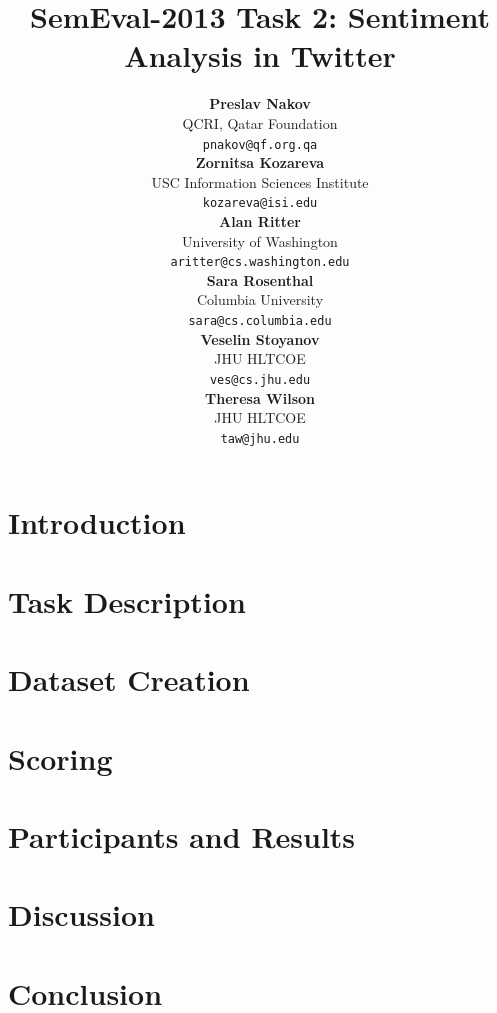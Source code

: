 \documentclass[11pt,letterpaper]{article}
\title{SemEval-2013 Task 2: Sentiment Analysis in Twitter}
\author{
{\bf Preslav Nakov}\\QCRI, Qatar Foundation\\{\small {\tt pnakov@qf.org.qa}}\\
{\bf Zornitsa Kozareva}\\USC Information Sciences Institute\\{\small {\tt kozareva@isi.edu}}\\
{\bf Alan Ritter}\\University of Washington\\{\small {\tt aritter@cs.washington.edu}}\\
\And
{\bf Sara Rosenthal }\\Columbia University\\{\small {\tt sara@cs.columbia.edu}}\\
{\bf Veselin Stoyanov}\\JHU HLTCOE\\{\small {\tt ves@cs.jhu.edu}}\\
{\bf Theresa Wilson}\\JHU HLTCOE\\{\small {\tt taw@jhu.edu}}\\
}
\date{}
\begin{document}
\maketitle

\begin{abstract}

\end{abstract}

\section{Introduction}
\label{sec-intro}


\section{Task Description}
\label{sec-decription}


\section{Dataset Creation}
\label{sec-dataset}


\section{Scoring}
\label{sec-scoring}


\section{Participants and Results}
\label{sec-results}


\section{Discussion}
\label{sec-discussion}


\section{Conclusion}
\label{sec-conclusions}







\end{document}
